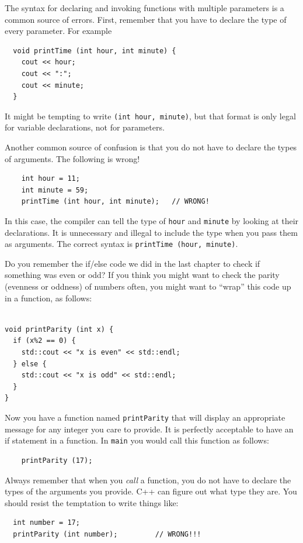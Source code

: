 The syntax for declaring and invoking functions with multiple
parameters is a common source of errors.  First, remember
that you have to declare the type of every parameter.  For
example

\begin{verbatim}
  void printTime (int hour, int minute) {
    cout << hour;
    cout << ":";
    cout << minute;
  }
\end{verbatim}
%
It might be tempting to write {\tt (int hour, minute)}, but
that format is only legal for variable declarations, not
for parameters.

Another common source of confusion is that you do not have
to declare the types of arguments.  The following is wrong!

\begin{verbatim}
    int hour = 11;
    int minute = 59;
    printTime (int hour, int minute);   // WRONG!
\end{verbatim}
%
In this case, the compiler can tell the type of {\tt hour}
and {\tt minute} by looking at their declarations.  It is
unnecessary and illegal to include the type when you pass them
as arguments.  The correct
syntax is {\tt printTime (hour, minute)}.

\label{printparity}
Do you remember the if/else code we did in the last chapter to check if something was even or odd? If you think you might want to check the parity
(evenness or oddness) of numbers often, you might want to
``wrap'' this code up in a function, as follows:

\begin{lstlisting}

void printParity (int x) {
  if (x%2 == 0) {
    std::cout << "x is even" << std::endl;
  } else {
    std::cout << "x is odd" << std::endl;
  }
}
\end{lstlisting}
%
Now you have a function named {\tt printParity} that will display
an appropriate message for any integer you care to provide. It is perfectly acceptable to have an if statement in a function.
In {\tt main} you would call this function as follows:

\begin{verbatim}
    printParity (17);
\end{verbatim}
%
Always remember that when you {\em call} a function, you do
not have to declare the types of the arguments you provide.
C++ can figure out what type they are.  You should resist the
temptation to write things like:

\begin{verbatim}
  int number = 17;
  printParity (int number);         // WRONG!!!
\end{verbatim}
